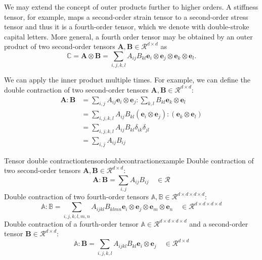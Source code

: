 We may extend the concept of outer products further to higher orders. A stiffness tensor, for example, maps a second-order strain tensor to a second-order stress tensor and thus it is a fourth-order tensor, which we denote with double-stroke capital letters. More general, a fourth order tensor may be obtained by an outer product of two second-order tensors $\mathbf{A},\mathbf{B}\in \mathcal{R}^{d \times d}$ as 
\begin{equation}
    \mathbb{C} = \mathbf{A} \otimes \mathbf{B} = \sum_{i,j,k,l} A_{ij}B_{kl}  \mathbf{e}_i \otimes \mathbf{e}_j \otimes \mathbf{e}_k \otimes \mathbf{e}_l.
\end{equation}

We can apply the inner product multiple times. For example, we can define the double contraction of two second-order tensors $\mathbf{A},\mathbf{B} \in \mathcal{R}^{d \times d}$: 
\begin{align}
    \mathbf{A} : \mathbf{B} 
        &= \sum_{i,j} A_{ij} \mathbf{e}_i \otimes \mathbf{e}_j :  \sum_{k,l} B_{kl} \mathbf{e}_k \otimes \mathbf{e}_l \\
        &= \sum_{i,j,k,l} A_{ij}B_{kl} (\mathbf{e}_i \otimes \mathbf{e}_j) :  (\mathbf{e}_k \otimes \mathbf{e}_l) \\
        &= \sum_{i,j,k,l} A_{ij}B_{kl} \delta_{ik} \delta_{jl} \\
        &= \sum_{i,j} A_{ij}B_{ij}
\end{align}

\begin{example}{Tensor double contraction}{tensordoublecontractionexample}
    Double contraction of two second-order tensors $\mathbf{A},\mathbf{B} \in \mathcal{R}^{d \times d}$: 
    \begin{equation}
        \mathbf{A} : \mathbf{B} = \sum_{i,j} A_{ij} B_{ij} \quad \in \mathcal{R}
    \end{equation}
    Double contraction of two fourth-order tensors $\mathbb{A},\mathbb{B} \in \mathcal{R}^{d \times d \times d \times d}$: 
    \begin{equation}
        \mathbb{A} : \mathbb{B} = \sum_{i,j,k,l,m,n} A_{ijkl} B_{klmn} \mathbf{e}_i \otimes \mathbf{e}_j \otimes \mathbf{e}_m \otimes \mathbf{e}_n \quad \in \mathcal{R}^{d \times d \times d \times d}
    \end{equation}
    Double contraction of a fourth-order tensor $\mathbb{A} \in \mathcal{R}^{d \times d \times d \times d}$ and a second-order tensor $\mathbf{B} \in \mathcal{R}^{d \times d}$: 
    \begin{equation}
        \mathbb{A} : \mathbf{B} = \sum_{i,j,k,l} A_{ijkl} B_{kl} \mathbf{e}_i \otimes \mathbf{e}_j \quad \in \mathcal{R}^{d \times d}
    \end{equation}
\end{example}

